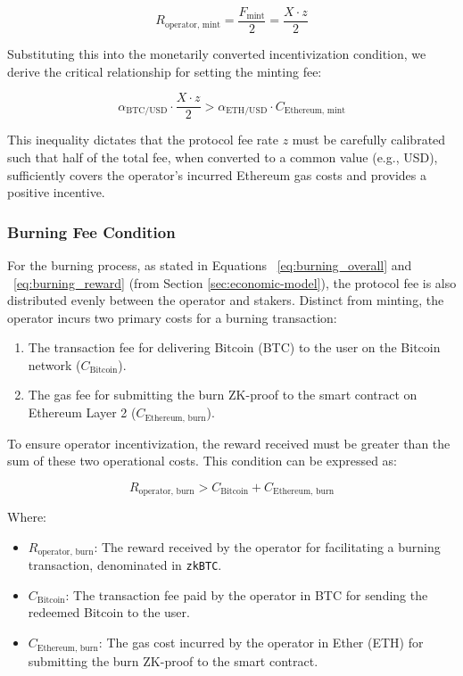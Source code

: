 \documentclass{DESSThesis}
\newcommand{\zktoken}{\texttt{zkBTC}}
\begin{document}
\[
R_{\text{operator, mint}} = \frac{F_{\text{mint}}}{2} = \frac{X \cdot z}{2}
\]

Substituting this into the monetarily converted incentivization condition, we derive the critical relationship for setting the minting fee:

\begin{equation}
\alpha_{\text{BTC/USD}} \cdot \frac{X \cdot z}{2} > \alpha_{\text{ETH/USD}} \cdot C_{\text{Ethereum, mint}}
\end{equation}

This inequality dictates that the protocol fee rate \(z\) must be carefully calibrated such that half of the total fee, when converted to a common value (e.g., USD), sufficiently covers the operator's incurred Ethereum gas costs and provides a positive incentive.

\subsubsection{Burning Fee Condition}
For the burning process, as stated in Equations ~\ref{eq:burning_overall} and ~\ref{eq:burning_reward} (from Section \ref{sec:economic-model}), the protocol fee is also distributed evenly between the operator and stakers. Distinct from minting, the operator incurs two primary costs for a burning transaction:
\begin{enumerate}
    \item The transaction fee for delivering Bitcoin (BTC) to the user on the Bitcoin network (\(C_{\text{Bitcoin}}\)).
    \item The gas fee for submitting the burn ZK-proof to the smart contract on Ethereum Layer 2 (\(C_{\text{Ethereum, burn}}\)).
\end{enumerate}
To ensure operator incentivization, the reward received must be greater than the sum of these two operational costs. This condition can be expressed as:

\[
R_{\text{operator, burn}} > C_{\text{Bitcoin}} + C_{\text{Ethereum, burn}}
\]

Where:
\begin{itemize}
    \item \(R_{\text{operator, burn}}\): The reward received by the operator for facilitating a burning transaction, denominated in \texttt{\zktoken}.
    \item \(C_{\text{Bitcoin}}\): The transaction fee paid by the operator in BTC for sending the redeemed Bitcoin to the user.
    \item \(C_{\text{Ethereum, burn}}\): The gas cost incurred by the operator in Ether (ETH) for submitting the burn ZK-proof to the smart contract.
\end{itemize}
\end{document}
